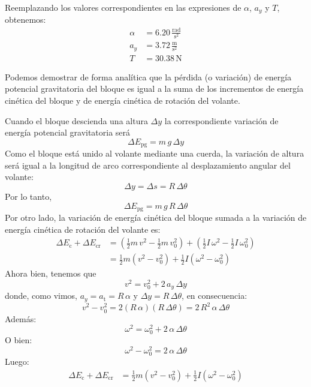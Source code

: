 \documentclass[addpoints]{exam}
\begin{document}
\begin{questions}
\begin{solution}
    Reemplazando los valores correspondientes en las expresiones de $\alpha$, $a_y$ y $T$, obtenemos:
    \begin{align*}
        \alpha &= 6.20 \, \frac{\text{rad}}{\text{s}^2} \\
        a_y &= 3.72 \, \frac{\text{m}}{\text{s}^2} \\
            T &= 30.38 \, \text{N}
    \end{align*}

    Podemos demostrar de forma analítica que la pérdida (o variación) de energía potencial gravitatoria del bloque es igual a la suma de los incrementos de energía cinética del bloque y de energía cinética de rotación del volante.

    Cuando el bloque descienda una altura $\Delta y$ la correspondiente variación de energía potencial gravitatoria será $$\Delta E_\text{pg} = m \, g \, \Delta y$$ Como el bloque está unido al volante mediante una cuerda, la variación de altura será igual a la longitud de arco correspondiente al desplazamiento angular del volante: $$\Delta y = \Delta s = R \, \Delta \theta$$ Por lo tanto, $$\Delta E_\text{pg} = m \, g \, R \, \Delta \theta$$ Por otro lado, la variación de energía cinética del bloque sumada a la variación de energía cinética de rotación del volante es: 
    \begin{equation*}
        \begin{split}
        \Delta E_\text{c} + \Delta E_\text{cr} &= \left(\frac{1}{2} m \, v^2 - \frac{1}{2} m \, v_0^2\right) + \left(\frac{1}{2} I \, \omega^2 - \frac{1}{2} I \, \omega_0^2\right) \\
        &= \frac{1}{2} m \left(v^2 - v_0^2\right) + \frac{1}{2} I \left(\omega^2 - \omega_0^2\right)
        \end{split}
    \end{equation*} Ahora bien, tenemos que $$v^2 = v_0^2 + 2 \, a_y \, \Delta y$$ donde, como vimos, $a_y = a_\text{t} = R \, \alpha$ y $\Delta y = R \, \Delta \theta$, en consecuencia: $$v^2 - v_0^2 = 2 \left(R \, \alpha\right) \left(R \, \Delta \theta\right) = 2 \, R^2 \, \alpha \, \Delta \theta$$ Además: $$\omega^2 = \omega_0^2 + 2 \, \alpha \, \Delta \theta$$ O bien: $$\omega^2 - \omega_0^2 = 2 \, \alpha \, \Delta \theta$$ Luego:
    \begin{equation*}
        \begin{split}
        \Delta E_\text{c} + \Delta E_\text{cr} &= \frac{1}{2} m \left(v^2 - v_0^2\right) + \frac{1}{2} I \left(\omega^2 - \omega_0^2\right) \\

\end{split}
\end{equation*}
\end{solution}
\end{questions}
\end{document}
